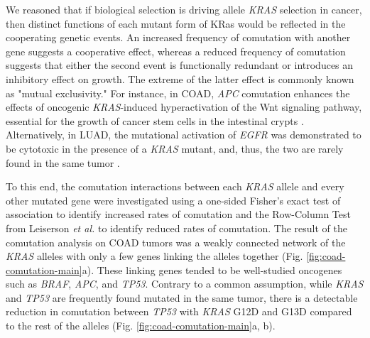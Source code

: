 \documentclass[english, 10pt, letterpaper]{article}
\newcommand{\KRAS}{\emph{KRAS}}
\newcommand{\kras}{KRas}
\begin{document}
We reasoned that if biological selection is driving allele \KRAS{} selection in cancer, then distinct functions of each mutant form of \kras{} would be reflected in the cooperating genetic events. 
An increased frequency of comutation with another gene suggests a cooperative effect, whereas a reduced frequency of comutation suggests that either the second event is functionally redundant or introduces an inhibitory effect on growth.
The extreme of the latter effect is commonly known as "mutual exclusivity."
For instance, in COAD, \emph{APC} comutation enhances the effects of oncogenic \KRAS{}-induced hyperactivation of the Wnt signaling pathway, essential for the growth of cancer stem cells in the intestinal crypts \cite{Janssen2006, Fearon2014, Sakai2018, Jauhri2017}.
Alternatively, in LUAD, the mutational activation of \emph{EGFR} was demonstrated to be cytotoxic in the presence of a \KRAS{} mutant, and, thus, the two are rarely found in the same tumor \cite{Unni2015EvidenceAdenocarcinoma., Ambrogio2017InAdenocarcinoma.}.

To this end, the comutation interactions between each \KRAS{} allele and every other mutated gene were investigated using a one-sided Fisher's exact test of association to identify  increased rates of comutation and the Row-Column Test from Leiserson \emph{et al.} \cite{Leiserson2016} to identify reduced rates of comutation.
The result of the comutation analysis on COAD tumors was a weakly connected network of the \KRAS{} alleles with only a few genes linking the alleles together (Fig. \ref{fig:coad-comutation-main}a).
These linking genes tended to be well-studied oncogenes such as \emph{BRAF}, \emph{APC}, and \emph{TP53}.
Contrary to a common assumption, while \KRAS{} and \emph{TP53} are frequently found mutated in the same tumor, there is a detectable reduction in comutation between \emph{TP53} with \KRAS{} G12D and G13D compared to the rest of the alleles (Fig. \ref{fig:coad-comutation-main}a, b).
\end{document}

